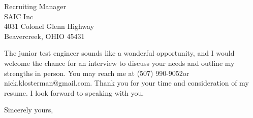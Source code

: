 \documentclass{letter} %
\makeatletter
\newcommand{\contactperson}{Recruiting Manager}
\newcommand{\contactCompany}{SAIC Inc}
\newcommand{\contactStreetAddress}{4031 Colonel Glenn Highway}
\newcommand{\contactCityStateZip}{Beavercreek, OHIO 45431 }
\newcommand{\position}{junior test  engineer }%
\newcommand{\personalphonenumber}{(507) 990-9052}
\newcommand{\personalemail}{nick.klosterman@gmail.com}
\makeatother
\begin{document}
\begin{letter}{\contactperson \\
\contactCompany \\
\contactStreetAddress \\
\contactCityStateZip

}
 
\noindent 
The \position sounds like a wonderful opportunity, and I would welcome the chance for an interview to discuss your needs and outline my strengths in person. 
You may reach me at \personalphonenumber or \personalemail.
Thank you for your time and consideration of my resume. I look forward to speaking with you.
 

\closing{Sincerely yours,} 
 

 

\end{letter}
 
\end{document}
